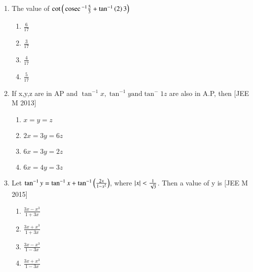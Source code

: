 \documentclass[journal,12pt,twocolumn]{IEEEtran}
\theoremstyle{remark}
\begin{document}
\begin{enumerate}
{\begin{multicols}{2}
		\begin{enumerate}
			\item{$4$}
			\item{$5$}
			\columnbreak
			\item{$1$}
			\item{$3$}
		\end{enumerate}
		\end{multicols}
	}
	\item{
			The value of $\cot\left(\,\text{cosec}\,^{-1}\frac{5}{3} + \tan^{-1}\left(2\right){3}\right)$
		\begin{multicols}{2}
		\begin{enumerate}
			\item{$\frac{6}{17}$}\\
			\item{$\frac{3}{17}$}
			\columnbreak
			\item{$ \frac{4}{17}$}\\
			\item{$ \frac{5}{17}$}
		\end{enumerate}
		\end{multicols}
	}
	\item{
			If x,y,z are in AP and $\tan^{-1}x, \tan^{-1}y \text{and} \tan^-1{z}$ are also in A.P, then \hfill [JEE M 2013]
		\begin{multicols}{2}
		\begin{enumerate}
			\item{$x=y=z$}
			\item{$2x=3y=6z$}
			\columnbreak
			\item{$6x=3y=2z$}
			\item{$6x=4y=3z$}
		\end{enumerate}
		\end{multicols}
	}
	\item{
			Let $\tan^{-1}y = \tan^{-1}x + \tan^{-1}\left(\frac{2x}{1-x^2}\right)$, where $\left\vert x\right\vert < \frac{1}{\sqrt{3}}$. Then a value of y is \hfill [JEE M 2015]
		\begin{multicols}{2}
		\begin{enumerate}
			\item{$\frac{3x - x^3}{1 + 3x}$}\\
			\item{$\frac{3x + x^3}{1 + 3x}$}
			\columnbreak
			\item{$\frac{3x - x^3}{1 - 3x}$}\\
			\item{$\frac{3x + x^3}{1 - 3x}$}
		\end{enumerate}
		\end{multicols}
}
\end{enumerate}
\end{document}
